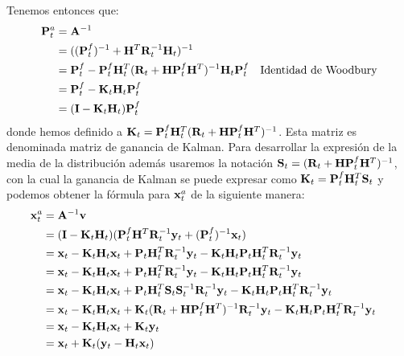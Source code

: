 Tenemos entonces que:
\begin{align*}
    \mathbf{P}_t^a &= \mathbf{A}^{-1} && \\
    &= ((\mathbf{P}_t^f)^{-1} + \mathbf{H}^T \mathbf{R}_t^{-1} \mathbf{H}_t)^{-1} && \\
    &= \mathbf{P}_t^f - \mathbf{P}_t^f \mathbf{H}_t^T (\mathbf{R}_t + \mathbf{H} \mathbf{P}_t^f \mathbf{H}^T)^{-1} \mathbf{H}_t \mathbf{P}_t^f && \text{Identidad de Woodbury}\\
    &= \mathbf{P}_t^f - \mathbf{K}_t \mathbf{H}_t \mathbf{P}_t^f && \\
    &= (\mathbf{I} - \mathbf{K}_t \mathbf{H}_t) \mathbf{P}_t^f && \\
\end{align*}
donde hemos definido a $\mathbf{K}_t = \mathbf{P}_t^f \mathbf{H}_t^T (\mathbf{R}_t + \mathbf{H} \mathbf{P}_t^f \mathbf{H}^T)^{-1}$. Esta matriz es denominada matriz de ganancia de Kalman. Para desarrollar la expresión de la media de la distribución además usaremos la notación $\mathbf{S}_t = (\mathbf{R}_t + \mathbf{H} \mathbf{P}_t^f \mathbf{H}^T)^{-1}$, con la cual la ganancia de Kalman se puede expresar como $\mathbf{K}_t = \mathbf{P}_t^f \mathbf{H}_t^T \mathbf{S}_t$ y podemos obtener la fórmula para $\mathbf{x}_t^a$ de la siguiente manera:
\begin{align*}
    \mathbf{x}_t^a &= \mathbf{A}^{-1} \mathbf{v} && \\
    &= (\mathbf{I} - \mathbf{K}_t \mathbf{H}_t) (\mathbf{P}_t^f \mathbf{H}^T \mathbf{R}_t^{-1} \mathbf{y}_t + (\mathbf{P}_t^{f})^{-1} \mathbf{x}_t) && \\
    &= \mathbf{x}_t - \mathbf{K}_t \mathbf{H}_t \mathbf{x}_t + \mathbf{P}_t \mathbf{H}_t^T \mathbf{R}_t^{-1} \mathbf{y}_t - \mathbf{K}_t \mathbf{H}_t \mathbf{P}_t \mathbf{H}_t^T \mathbf{R}_t^{-1} \mathbf{y}_t && \\
    &= \mathbf{x}_t - \mathbf{K}_t \mathbf{H}_t \mathbf{x}_t + \mathbf{P}_t \mathbf{H}_t^T \mathbf{R}_t^{-1} \mathbf{y}_t - \mathbf{K}_t \mathbf{H}_t \mathbf{P}_t \mathbf{H}_t^T \mathbf{R}_t^{-1} \mathbf{y}_t && \\
    &= \mathbf{x}_t - \mathbf{K}_t \mathbf{H}_t \mathbf{x}_t + \mathbf{P}_t \mathbf{H}_t^T \mathbf{S}_t \mathbf{S}_t^{-1} \mathbf{R}_t^{-1} \mathbf{y}_t - \mathbf{K}_t \mathbf{H}_t \mathbf{P}_t \mathbf{H}_t^T \mathbf{R}_t^{-1} \mathbf{y}_t && \\
    &= \mathbf{x}_t - \mathbf{K}_t \mathbf{H}_t \mathbf{x}_t + \mathbf{K}_t (\mathbf{R}_t + \mathbf{H} \mathbf{P}_t^f \mathbf{H}^T)^{-1} \mathbf{R}_t^{-1} \mathbf{y}_t - \mathbf{K}_t \mathbf{H}_t \mathbf{P}_t \mathbf{H}_t^T \mathbf{R}_t^{-1} \mathbf{y}_t && \\
    &= \mathbf{x}_t - \mathbf{K}_t \mathbf{H}_t \mathbf{x}_t + \mathbf{K}_t \mathbf{y}_t && \\
    &= \mathbf{x}_t + \mathbf{K}_t (\mathbf{y}_t - \mathbf{H}_t \mathbf{x}_t) && \\
\end{align*}
